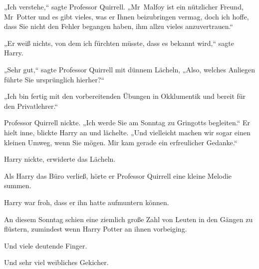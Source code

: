 „Ich verstehe,“ sagte Professor Quirrell. „Mr~Malfoy ist ein nützlicher Freund, Mr~Potter und es gibt vieles, was er Ihnen beizubringen vermag, doch ich hoffe, dass Sie nicht den Fehler begangen haben, ihm allzu vieles anzuvertrauen.“

„Er weiß nichts, von dem ich fürchten müsste, dass es bekannt wird,“ sagte Harry.

„Sehr gut,“ sagte Professor Quirrell mit dünnem Lächeln, „Also, welches Anliegen führte Sie ursprünglich hierher?“

„Ich bin fertig mit den vorbereitenden Übungen in Okklumentik und bereit für den Privatlehrer.“

Professor Quirrell nickte. „Ich werde Sie am Sonntag zu Gringotts begleiten.“ Er hielt inne, blickte Harry an und lächelte. „Und vielleicht machen wir sogar einen kleinen Umweg, wenn Sie mögen. Mir kam gerade ein erfreulicher Gedanke.“

Harry nickte, erwiderte das Lächeln.

Als Harry das Büro verließ, hörte er Professor Quirrell eine kleine Melodie summen.

Harry war froh, dass er ihn hatte aufmuntern können.

\later

An diesem Sonntag schien eine ziemlich große Zahl von Leuten in den Gängen zu flüstern, zumindest wenn Harry Potter an ihnen vorbeiging.

Und viele deutende Finger.

Und sehr viel weibliches Gekicher.

